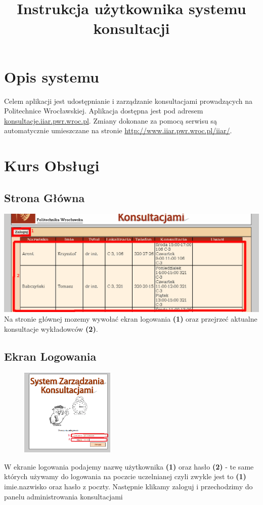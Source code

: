 \documentclass[12pt]{article} %
\title{Instrukcja użytkownika systemu konsultacji}
\begin{document}
\maketitle
\newpage

\section{Opis systemu}
Celem aplikacji jest udostępnianie i zarządzanie konsultacjami prowadzących na
Politechnice Wrocławskiej. Aplikacja dostępna jest pod adresem
\underline{konsultacje.iiar.pwr.wroc.pl}. Zmiany dokonane za pomocą serwisu są
automatycznie umieszczane na stronie
\underline{http://www.iiar.pwr.wroc.pl/iiar/}.


\section{Kurs Obsługi}
\subsection {Strona Główna}
\includegraphics [width=1\textwidth]{instr1.png} 
\\
Na stronie głównej mozemy wywołać ekran logowania \textbf{(1)} oraz przejrzeć
aktualne konsultacje wykładowców \textbf{(2)}.
\subsection {Ekran Logowania}
\begin{figure}

 \begin{center}
 \includegraphics[width=0.4\textwidth]{instr2.png}
 \end{center}


\end{figure}
W ekranie logowania podajemy nazwę użytkownika \textbf {(1)} oraz hasło \textbf{(2)} - te same których używamy do logowania na poczcie uczelnianej czyli zwykle jest to  \textbf {(1)} imie.nazwisko oraz hasło z poczty. Następnie klikamy zaloguj i przechodzimy do panelu administrowania konsultacjami\\
\newpage
\end{document}
